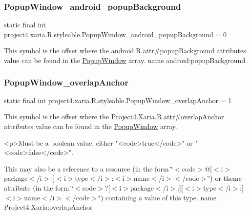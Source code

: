 \subsubsection{\texorpdfstring{Popup\+Window\+\_\+android\+\_\+popup\+Background}{PopupWindow\_android\_popupBackground}}
{\footnotesize\ttfamily static final int project4.\+xaria.\+R.\+styleable.\+Popup\+Window\+\_\+android\+\_\+popup\+Background = 0\hspace{0.3cm}{\ttfamily [static]}}

This symbol is the offset where the \hyperlink{}{android.\+R.\+attr\#popup\+Background} attribute\textquotesingle{}s value can be found in the \hyperlink{classproject4_1_1xaria_1_1R_1_1styleable_a55b1ea3ea17bd2c0ca0038ad45c86e31}{Popup\+Window} array.  name android\+:popup\+Background \mbox{\label{classproject4_1_1xaria_1_1R_1_1styleable_acfb6ddfbcd2513d18991d64cf7f6f54d}} 
\subsubsection{\texorpdfstring{Popup\+Window\+\_\+overlap\+Anchor}{PopupWindow\_overlapAnchor}}
{\footnotesize\ttfamily static final int project4.\+xaria.\+R.\+styleable.\+Popup\+Window\+\_\+overlap\+Anchor = 1\hspace{0.3cm}{\ttfamily [static]}}

This symbol is the offset where the \hyperlink{}{Project4.\+Xaria.\+R.\+attr\#overlap\+Anchor} attribute\textquotesingle{}s value can be found in the \hyperlink{classproject4_1_1xaria_1_1R_1_1styleable_a55b1ea3ea17bd2c0ca0038ad45c86e31}{Popup\+Window} array.

\begin{DoxyVerb}      <p>Must be a boolean value, either "<code>true</code>" or "<code>false</code>".
\end{DoxyVerb}
 

This may also be a reference to a resource (in the form \char`\"{}$<$code$>$@\mbox{[}$<$i$>$package$<$/i$>$\+:\mbox{]}$<$i$>$type$<$/i$>$\+:$<$i$>$name$<$/i$>$$<$/code$>$\char`\"{}) or theme attribute (in the form \char`\"{}$<$code$>$?\mbox{[}$<$i$>$package$<$/i$>$\+:\mbox{]}\mbox{[}$<$i$>$type$<$/i$>$\+:\mbox{]}$<$i$>$name$<$/i$>$$<$/code$>$\char`\"{}) containing a value of this type.  name Project4.\+Xaria\+:overlap\+Anchor \mbox{\label{classproject4_1_1xaria_1_1R_1_1styleable_a00ba6404cc13671fe72e09b01c9d644f}} 
